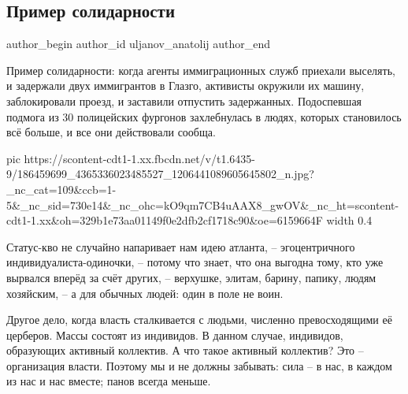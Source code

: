  
 
 
 
 
 
\subsection{Пример солидарности}
\label{sec:19_05_2021.fb.uljanov_anatolij.1.solidarnost}
 
\ifcmt
 author_begin
   author_id uljanov_anatolij
 author_end
\fi

Пример солидарности: когда агенты иммиграционных служб приехали выселять, и
задержали двух иммигрантов в Глазго, активисты окружили их машину,
заблокировали проезд, и заставили отпустить задержанных. Подоспевшая подмога из
30 полицейских фургонов захлебнулась в людях, которых становилось всё больше, и
все они действовали сообща. 

\ifcmt
  pic https://scontent-cdt1-1.xx.fbcdn.net/v/t1.6435-9/186459699_4365336023485527_1206441089605645802_n.jpg?_nc_cat=109&ccb=1-5&_nc_sid=730e14&_nc_ohc=kO9qm7CB4uAAX8_gwOV&_nc_ht=scontent-cdt1-1.xx&oh=329b1e73aa01149f0e2dfb2cf1718c90&oe=6159664F
  width 0.4
\fi

Статус-кво не случайно напаривает нам идею атланта, – эгоцентричного
индивидуалиста-одиночки, – потому что знает, что она выгодна тому, кто уже
вырвался вперёд за счёт других, – верхушке, элитам, барину, папику, людям
хозяйским, – а для обычных людей: один в поле не воин. 

Другое дело, когда власть сталкивается с людьми, численно превосходящими её
церберов. Массы состоят из индивидов. В данном случае, индивидов, образующих
активный коллектив. А что такое активный коллектив? Это – организация власти.
Поэтому мы и не должны забывать: сила – в нас, в каждом из нас и нас вместе;
панов всегда меньше.
